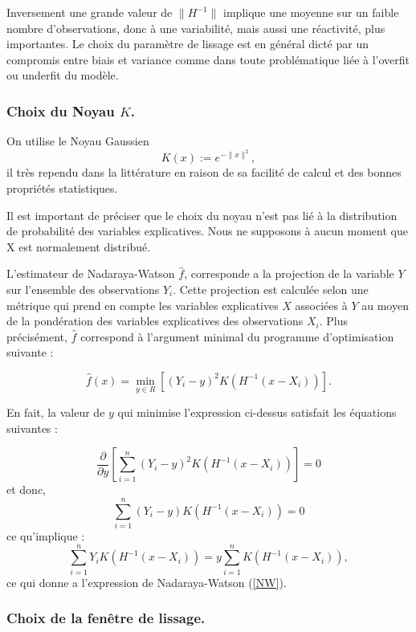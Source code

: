\documentclass[12pt, a4paper]{book}
\begin{document}
Inversement une grande valeur de $\|H^{-1}\|$ implique une moyenne sur un faible nombre d'observations, donc à une variabilité, mais aussi une réactivité, plus importantes. Le choix du paramètre de lissage est en général dicté par un compromis entre biais et variance comme dans toute problématique liée à l'overfit ou underfit du modèle. 

\subsubsection{Choix du Noyau $K$.}

On utilise le Noyau Gaussien 
$$ K(x):=e^{-\|x\|^2}, $$
il très rependu dans la littérature en raison de sa facilité de calcul et des bonnes propriétés statistiques. 

Il est important de préciser que le choix du noyau n'est pas lié à la distribution de probabilité des variables explicatives. Nous ne supposons à aucun moment que X est normalement distribué.

\bigskip

L'estimateur de Nadaraya-Watson $\hat{f}$, corresponde a la projection de la variable $Y$ sur l'ensemble des observations $Y_i$. Cette projection est calculée selon une métrique qui prend en compte les variables explicatives $X$ associées à $Y$ au moyen de la pondération des variables explicatives des observations $X_i$. Plus précisément, $\hat{f}$ correspond à l'argument minimal du programme d'optimisation suivante :

$$ \hat{f}(x) = \min_{y\in R} \left[(Y_i-y)^2 K(H^{-1}(x-X_i))\right].$$

En fait, la valeur de $y$ qui minimise l'expression ci-dessus satisfait les équations suivantes :

$$ \frac{\partial }{\partial y}\left[\sum_{i=1}^n(Y_i-y)^2K(H^{-1}(x-X_i))\right]= 0$$
et donc,
$$ \sum_{i=1}^n(Y_i-y)K(H^{-1}(x-X_i)) = 0 $$
ce qu'implique :
$$\sum_{i=1}^n Y_i K(H^{-1}(x-X_i)) = y \sum_{i=1}^n K(H^{-1}(x-X_i)),$$
ce qui donne a l'expression de Nadaraya-Watson (\ref{NW}).
\subsubsection{Choix de la fenêtre de lissage.}
\end{document}
